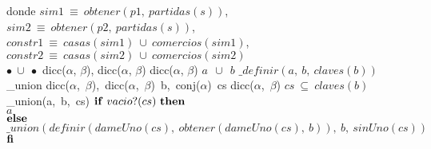 \tab donde $sim1\ \equiv\ obtener(p1,\ partidas(s))$, \\
\tab\tab\tab \: $sim2\ \equiv\ obtener(p2,\ partidas(s))$, \\
\tab\tab\tab \: $constr1\ \equiv\ casas(sim1)\ \cup\ comercios(sim1)$, \\
\tab\tab\tab \: $constr2\ \equiv\ casas(sim2)\ \cup\ comercios(sim2)$
\\
\tadOperacion
    {$\bullet\ \cup\ \bullet$}
    {dicc($\alpha$, $\beta$), dicc($\alpha$, $\beta$)}
    {dicc($\alpha$, $\beta$)}
    {}
\tadAxioma
    {$a\ \ \cup\ \ b$}
    {$ \_definir(a,\ b,\ claves(b))$}
\vspace{4mm}
\tadOperacion
    {\_union}
    {dicc($\alpha$,\ $\beta$),\ dicc($\alpha$,\ $\beta$)\ b,\ conj($\alpha$)\ cs}
    {dicc($\alpha$,\ $\beta$)}
    {$cs\ \subseteq\ claves(b)$}
\tadAxioma
    {\_union(a,\ b,\ cs)}
    {$ 
    \LIF\ vacio?(cs)\ \LTHEN\ $\\$ 
    $\tab$ a $\\$
    \textrm{\textbf{else}} $\\$ 
    $\tab$ \_union(definir(dameUno(cs),\ obtener(dameUno(cs),\ b)),\ b,\ sinUno(cs)) $\\$ 
    \textrm{\textbf{fi}}
    $}